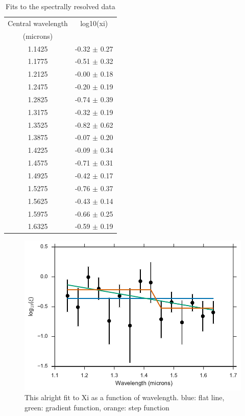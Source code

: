 \documentclass[a4paper,fleqn,usenatbib]{mnras}
\begin{document}
\begin{table}{
			\caption{Fits to the spectrally resolved data}
			\begin{center}
				\begin{tabular}{c c}
					\hline
					\hline
					Central wavelength &   log10(xi)  \\
					(microns) & \\
					\hline
1.1425 & -0.32 $\pm$ 0.27 \\
1.1775 & -0.51 $\pm$ 0.32 \\
1.2125 & -0.00 $\pm$ 0.18 \\
1.2475 & -0.20 $\pm$ 0.19 \\
1.2825 & -0.74 $\pm$ 0.39 \\
1.3175 & -0.32 $\pm$ 0.19 \\
1.3525 & -0.82 $\pm$ 0.62 \\
1.3875 & -0.07 $\pm$ 0.20 \\
1.4225 & -0.09 $\pm$ 0.34 \\
1.4575 & -0.71 $\pm$ 0.31 \\
1.4925 & -0.42 $\pm$ 0.17 \\
1.5275 & -0.76 $\pm$ 0.37 \\
1.5625 & -0.43 $\pm$ 0.14 \\
1.5975 & -0.66 $\pm$ 0.25 \\
1.6325 & -0.59 $\pm$ 0.19 \\
\end{tabular}
\end{center}
\label{tab:specresults}
}
\end{table}

\begin{figure}
	\begin{center}
		\includegraphics[width=\columnwidth]{img/all_models.pdf}
		\caption{This alright fit to Xi as a function of wavelength. blue: flat line, green: gradient function, orange: step function}
		\label{fig:best_fit_flux}
	\end{center}
\end{figure}
\end{document}

